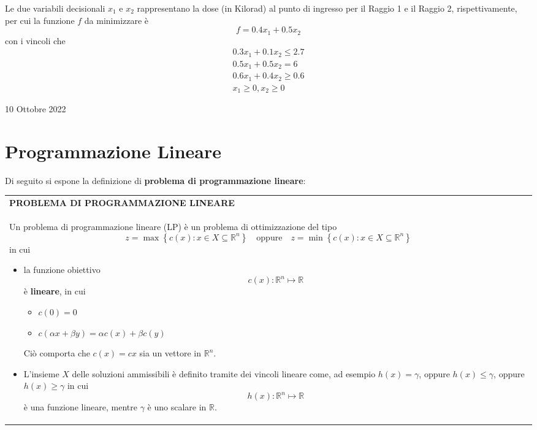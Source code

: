 \documentclass[a4paper]{extarticle}
\renewcommand\arraystretch{}
\begin{document}
\vspace{1em}
\noindent
Le due variabili decisionali $x_1$ e $x_2$ rappresentano la dose (in Kilorad) al punto di ingresso per il Raggio 1 e il Raggio 2, rispettivamente, per cui la funzione $f$ da minimizzare è
\[f = 0.4x_1 + 0.5x_2\]
con i vincoli che
\begin{align}
    0.3x_1 + 0.1x_2 \leq 2.7\\
    0.5x_1 + 0.5x_2 = 6\\
    0.6x_1+0.4x_2 \geq 0.6\\
    x_1 \geq 0, x_2 \geq 0
\end{align}

\newpage
\begin{center}
    10 Ottobre 2022
\end{center}
\section{Programmazione Lineare}
Di seguito si espone la definizione di \textbf{problema di programmazione lineare}: 

\vspace{1em}
\setlength{\tabcolsep}{14pt}
\renewcommand{\arraystretch}{2}
\noindent
\begin{tabularx}{\textwidth}{@{}|P|@{}}
    \hline
    {\textbf{PROBLEMA DI PROGRAMMAZIONE LINEARE}}\\
    \parbox{\linewidth}{Un problema di programmazione lineare (LP) è un problema di ottimizzazione del tipo
    \[z = \max \left\{c(x) : x \in X \subseteq \mathbb{R}^n \right\} \hspace{1em} \text{oppure} \hspace{1em} z = \min \left\{c(x) : x \in X \subseteq \mathbb{R}^n \right\}\]
    in cui
    \begin{itemize}
        \item la funzione obiettivo
        \[c(x) : \mathbb{R}^n \longmapsto \mathbb{R}\]
        è \textbf{lineare}, in cui
        \begin{itemize}
            \item $c(0)=0$
            \item $c(\alpha x + \beta y) = \alpha c(x) + \beta c(y)$
        \end{itemize}
        Ciò comporta che $c(x) = c x$ sia un vettore in $\mathbb{R}^n$.

        \item L'insieme $X$ delle soluzioni ammissibili è definito tramite dei vincoli lineare come, ad esempio $h(x) = \gamma$, oppure $h(x) \leq \gamma$, oppure $h(x) \geq \gamma$ in cui
        \[h(x) : \mathbb{R}^n \longmapsto \mathbb{R}\]
        è una funzione lineare, mentre $\gamma$ è uno scalare in $\mathbb{R}$.
    \end{itemize}
    \vspace{1mm}}\\
    \hline
\end{tabularx}
\end{document}
